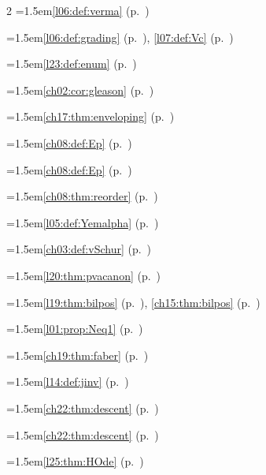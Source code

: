 \begin{multicols}{2}
\hangindent=1.5em\quad \ref{l06:def:verma} (p.~\pageref{l06:def:verma})\par
\hangindent=1.5em\quad \ref{l06:def:grading} (p.~\pageref{l06:def:grading}), \ref{l07:def:Vc} (p.~\pageref{l07:def:Vc})\par
\hangindent=1.5em\quad \ref{l23:def:enum} (p.~\pageref{l23:def:enum})\par
\hangindent=1.5em\quad \ref{ch02:cor:gleason} (p.~\pageref{ch02:cor:gleason})\par
\hangindent=1.5em\quad \ref{ch17:thm:enveloping} (p.~\pageref{ch17:thm:enveloping})\par
\hangindent=1.5em\quad \ref{ch08:def:Ep} (p.~\pageref{ch08:def:Ep})\par
\hangindent=1.5em\quad \ref{ch08:def:Ep} (p.~\pageref{ch08:def:Ep})\par
\hangindent=1.5em\quad \ref{ch08:thm:reorder} (p.~\pageref{ch08:thm:reorder})\par
\hangindent=1.5em\quad \ref{l05:def:Yemalpha} (p.~\pageref{l05:def:Yemalpha})\par
\hangindent=1.5em\quad \ref{ch03:def:vSchur} (p.~\pageref{ch03:def:vSchur})\par
\hangindent=1.5em\quad \ref{l20:thm:pvacanon} (p.~\pageref{l20:thm:pvacanon})\par
\hangindent=1.5em\quad \ref{l19:thm:bilpos} (p.~\pageref{l19:thm:bilpos}), \ref{ch15:thm:bilpos} (p.~\pageref{ch15:thm:bilpos})\par
\hangindent=1.5em\quad \ref{l01:prop:Neq1} (p.~\pageref{l01:prop:Neq1})\par
\hangindent=1.5em\quad \ref{ch19:thm:faber} (p.~\pageref{ch19:thm:faber})\par
\hangindent=1.5em\quad \ref{l14:def:jinv} (p.~\pageref{l14:def:jinv})\par
\hangindent=1.5em\quad \ref{ch22:thm:descent} (p.~\pageref{ch22:thm:descent})\par
\hangindent=1.5em\quad \ref{ch22:thm:descent} (p.~\pageref{ch22:thm:descent})\par
\hangindent=1.5em\quad \ref{l25:thm:HOde} (p.~\pageref{l25:thm:HOde})\par

\end{multicols}

